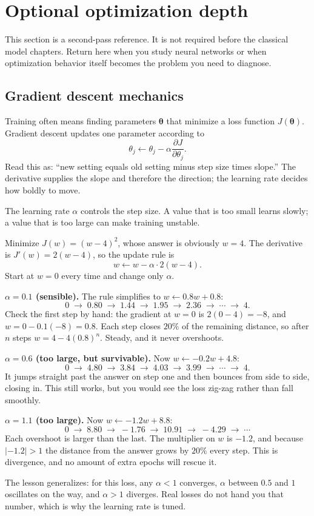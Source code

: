 \section{Optional optimization depth}
\begin{optionaltopic}
This section is a second-pass reference. It is not required before the classical model chapters. Return here when you study neural networks or when optimization behavior itself becomes the problem you need to diagnose.
\end{optionaltopic}

\subsection{Gradient descent mechanics}

Training often means finding parameters $\bm{\theta}$ that minimize a loss function $J(\bm{\theta})$. Gradient descent updates one parameter according to
\[
  \theta_j\leftarrow\theta_j-\alpha
  \frac{\partial J}{\partial\theta_j}.
\]
Read this as: ``new setting equals old setting minus step size times slope.'' The derivative supplies the slope and therefore the direction; the learning rate decides how boldly to move.

The learning rate $\alpha$ controls the step size. A value that is too small learns slowly; a value that is too large can make training unstable.

\begin{workedexample}
Minimize $J(w)={(w-4)}^2$, whose answer is obviously $w=4$. The derivative is $J'(w)=2(w-4)$, so the update rule is
\[
  w \leftarrow w-\alpha\cdot 2(w-4).
\]
Start at $w=0$ every time and change only $\alpha$.

\textbf{$\alpha=0.1$ (sensible).} The rule simplifies to $w\leftarrow 0.8w+0.8$:
\[
  0 \;\to\; 0.80 \;\to\; 1.44 \;\to\; 1.95 \;\to\; 2.36 \;\to\;\cdots\;\to\; 4.
\]
Check the first step by hand: the gradient at $w=0$ is $2(0-4)=-8$, and $w=0-0.1(-8)=0.8$. Each step closes $20\%$ of the remaining distance, so after $n$ steps $w=4-4{(0.8)}^n$. Steady, and it never overshoots.

\textbf{$\alpha=0.6$ (too large, but survivable).} Now $w\leftarrow-0.2w+4.8$:
\[
  0 \;\to\; 4.80 \;\to\; 3.84 \;\to\; 4.03 \;\to\; 3.99 \;\to\;\cdots\;\to\; 4.
\]
It jumps straight past the answer on step one and then bounces from side to side, closing in. This still works, but you would see the loss zig-zag rather than fall smoothly.

\textbf{$\alpha=1.1$ (too large).} Now $w\leftarrow-1.2w+8.8$:
\[
  0 \;\to\; 8.80 \;\to\; -1.76 \;\to\; 10.91 \;\to\; -4.29 \;\to\;\cdots
\]
Each overshoot is larger than the last. The multiplier on $w$ is $-1.2$, and because $|-1.2|>1$ the distance from the answer grows by $20\%$ every step. This is divergence, and no amount of extra epochs will rescue it.

The lesson generalizes: for this loss, any $\alpha<1$ converges, $\alpha$ between $0.5$ and $1$ oscillates on the way, and $\alpha>1$ diverges. Real losses do not hand you that number, which is why the learning rate is tuned.
\end{workedexample}

